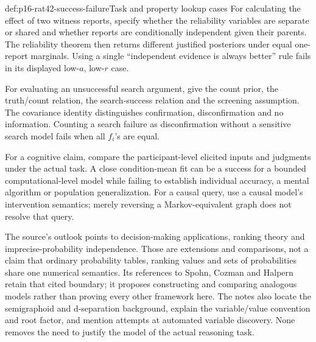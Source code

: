 \begin{hbexample}{def:p16-rat42-success-failure}{Task and property lookup cases}
For calculating the effect of two witness reports, specify whether the
reliability variables are separate or shared and whether reports are
conditionally independent given their parents. The reliability theorem
then returns different justified posteriors under equal one-report
marginals. Using a single ``independent evidence is always better''
rule fails in its displayed low-\(a\), low-\(r\) case.

For evaluating an unsuccessful search argument, give the count prior,
the truth/count relation, the search-success relation and the screening
assumption. The covariance identity distinguishes confirmation,
disconfirmation and no information. Counting a search failure as
disconfirmation without a sensitive search model fails when all
\(f_i\)'s are equal.

For a cognitive claim, compare the participant-level elicited inputs and
judgments under the actual task. A close condition-mean fit can be a
success for a bounded computational-level model while failing to establish
individual accuracy, a mental algorithm or population generalization.
For a causal query, use a causal model's intervention semantics; merely
reversing a Markov-equivalent graph does not resolve that query.
\end{hbexample}

The source's outlook points to decision-making applications, ranking
theory and imprecise-probability independence. Those are extensions and
comparisons, not a claim that ordinary probability tables, ranking values
and sets of probabilities share one numerical semantics. Its references
to Spohn, Cozman and Halpern retain that cited boundary; it proposes
constructing and comparing analogous models rather than proving every
other framework here. The notes also locate the semigraphoid and
d-separation background, explain the variable/value convention and root
factor, and mention attempts at automated variable discovery. None
removes the need to justify the model of the actual reasoning task.
\cite[Sec.~5 and notes~1--10, pp.~262--264]{Hartmann2021BayesNets}
